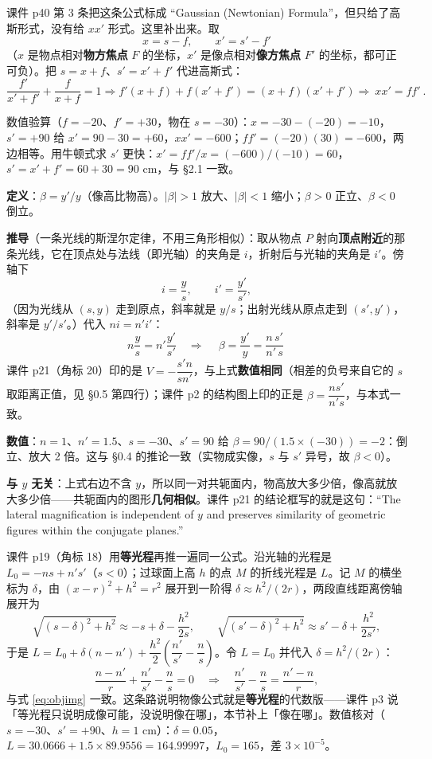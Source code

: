 \documentclass[11pt]{ctexart}
\begin{document}

课件 p40 第 3 条把这条公式标成 ``Gaussian (Newtonian) Formula''，但只给了高斯形式，没有给 $xx'$ 形式。这里补出来。取
\[
x=s-f,\qquad x'=s'-f'
\]
（$x$ 是物点相对\textbf{物方焦点} $F$ 的坐标，$x'$ 是像点相对\textbf{像方焦点} $F'$ 的坐标，都可正可负）。把 $s=x+f$、$s'=x'+f'$ 代进高斯式：
\[
\frac{f'}{x'+f'}+\frac{f}{x+f}=1
\Longrightarrow f'(x+f)+f(x'+f')=(x+f)(x'+f')
\Longrightarrow \boxed{\ xx'=ff'\ }.
\]

数值验算（$f=-20$、$f'=+30$，物在 $s=-30$）：$x=-30-(-20)=-10$，$s'=+90$ 给 $x'=90-30=+60$，$xx'=-600$；$ff'=(-20)(30)=-600$，两边相等。用牛顿式求 $s'$ 更快：$x'=ff'/x=(-600)/(-10)=60$，$s'=x'+f'=60+30=90$ cm，与 §2.1 一致。


\textbf{定义}：$\beta=y'/y$（像高比物高）。$|\beta|>1$ 放大、$|\beta|<1$ 缩小；$\beta>0$ 正立、$\beta<0$ 倒立。

\textbf{推导}（一条光线的斯涅尔定律，不用三角形相似）：取从物点 $P$ 射向\textbf{顶点附近}的那条光线，它在顶点处与法线（即光轴）的夹角是 $i$，折射后与光轴的夹角是 $i'$。傍轴下
\[
i=\frac{y}{s},\qquad i'=\frac{y'}{s'},
\]
（因为光线从 $(s,y)$ 走到原点，斜率就是 $y/s$；出射光线从原点走到 $(s',y')$，斜率是 $y'/s'$。）代入 $ni=n'i'$：
\[
n\frac{y}{s}=n'\frac{y'}{s'}\quad\Longrightarrow\quad
\boxed{\ \beta=\frac{y'}{y}=\frac{n\,s'}{n'\,s}\ }
\]
课件 p21（角标 20）印的是 $V=-\dfrac{s'n}{sn'}$，与上式\textbf{数值相同}（相差的负号来自它的 $s$ 取距离正值，见 §0.5 第四行）；课件 p2 的结构图上印的正是 $\beta=\dfrac{ns'}{n's}$，与本式一致。

\textbf{数值}：$n=1$、$n'=1.5$、$s=-30$、$s'=90$ 给 $\beta=90/(1.5\times(-30))=-2$：倒立、放大 2 倍。这与 §0.4 的推论一致（实物成实像，$s$ 与 $s'$ 异号，故 $\beta<0$）。

\textbf{与 $y$ 无关}：上式右边不含 $y$，所以同一对共轭面内，物高放大多少倍，像高就放大多少倍——共轭面内的图形\textbf{几何相似}。课件 p21 的结论框写的就是这句：``The lateral magnification is independent of $y$ and preserves similarity of geometric figures within the conjugate planes.''


课件 p19（角标 18）用\textbf{等光程}再推一遍同一公式。沿光轴的光程是 $L_0=-ns+n's'$（$s<0$）；过球面上高 $h$ 的点 $M$ 的折线光程是 $L$。记 $M$ 的横坐标为 $\delta$，由 $(x-r)^2+h^2=r^2$ 展开到一阶得 $\delta\approx h^2/(2r)$，两段直线距离傍轴展开为
\[
\sqrt{(s-\delta)^2+h^2}\approx -s+\delta-\frac{h^2}{2s},
\qquad
\sqrt{(s'-\delta)^2+h^2}\approx s'-\delta+\frac{h^2}{2s'},
\]
于是 $L=L_0+\delta(n-n')+\dfrac{h^2}{2}\left(\dfrac{n'}{s'}-\dfrac{n}{s}\right)$。令 $L=L_0$ 并代入 $\delta=h^2/(2r)$：
\[
\frac{n-n'}{r}+\frac{n'}{s'}-\frac{n}{s}=0
\quad\Longrightarrow\quad
\frac{n'}{s'}-\frac{n}{s}=\frac{n'-n}{r},
\]
与式 \eqref{eq:objimg} 一致。这条路说明物像公式就是\textbf{等光程}的代数版——课件 p3 说「等光程只说明成像可能，没说明像在哪」，本节补上「像在哪」。数值核对（$s=-30$、$s'=+90$、$h=1$ cm）：$\delta=0.05$，$L=30.0666+1.5\times89.9556=164.99997$，$L_0=165$，差 $3\times10^{-5}$。
\end{document}
